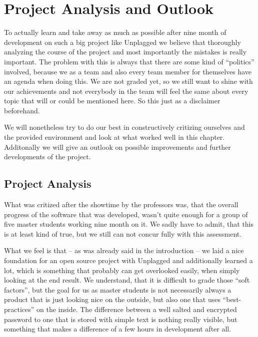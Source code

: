 \chapter{Project Analysis and Outlook}\label{chap:summaryAndOutlook}

To actually learn and take away as much as possible after nine month of development on such a big project like Unplagged we believe that thoroughly analyzing the course of the project and most importantly the mistakes is really important. The problem with this is always that there are some kind of \enquote{politics} involved, because we as a team and also every team member for themselves have an agenda when doing this. We are not graded yet, so we still want to shine with our achievements and not everybody in the team will feel the same about every topic that will or could be mentioned here. So this just as a disclaimer beforehand. 

We will nonetheless try to do our best in constructively critizing ourselves and the provided environment and look at what worked well in this chapter. Additonally we will give an outlook on possible improvements and further developments of the project.

\section{Project Analysis}

What was critized after the showtime by the professors was, that the overall progress of the software that was developed, wasn't quite enough for a group of five master students working nine month on it. We sadly have to admit, that this is at least kind of true, but we still can not concur fully with this assessment.

What we feel is that -- as was already said in the introduction -- we laid a nice foundation for an open source project with Unplagged and additionally learned a lot, which is something that probably can get overlooked easily, when simply looking at the end result. We understand, that it is difficult to grade those \enquote{soft factors}, but the goal for us as master students is not necessarily always a product that is just looking nice on the outside, but also one that uses \enquote{best-practices} on the inside. 
The difference between a well salted and encrypted password to one that is stored with simple text is nothing really visible, but something that makes a difference of a few hours in development after all.

